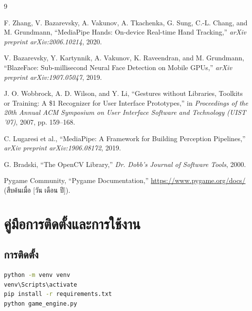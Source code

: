 \documentclass[12pt,a4paper]{report}
\begin{document}
\begin{thebibliography}{9}

F. Zhang, V. Bazarevsky, A. Vakunov, A. Tkachenka, G. Sung, C.-L. Chang, and M. Grundmann,
``MediaPipe Hands: On-device Real-time Hand Tracking,''
\textit{arXiv preprint arXiv:2006.10214}, 2020.

V. Bazarevsky, Y. Kartynnik, A. Vakunov, K. Raveendran, and M. Grundmann,
``BlazeFace: Sub-millisecond Neural Face Detection on Mobile GPUs,''
\textit{arXiv preprint arXiv:1907.05047}, 2019.

J. O. Wobbrock, A. D. Wilson, and Y. Li,
``Gestures without Libraries, Toolkits or Training: A \$1 Recognizer for User Interface Prototypes,''
in \textit{Proceedings of the 20th Annual ACM Symposium on User Interface Software and Technology (UIST '07)}, 2007, pp. 159--168.

C. Lugaresi et al.,
``MediaPipe: A Framework for Building Perception Pipelines,''
\textit{arXiv preprint arXiv:1906.08172}, 2019.

G. Bradski, ``The OpenCV Library,'' \textit{Dr. Dobb's Journal of Software Tools}, 2000.

Pygame Community, ``Pygame Documentation,'' \url{https://www.pygame.org/docs/} (สืบค้นเมื่อ [วัน เดือน ปี]).

\end{thebibliography}

\appendix

\chapter{คู่มือการติดตั้งและการใช้งาน}

\section{การติดตั้ง}
\begin{lstlisting}[language=bash, numbers=none]
python -m venv venv
venv\Scripts\activate
pip install -r requirements.txt
python game_engine.py
\end{lstlisting}
\end{document}

